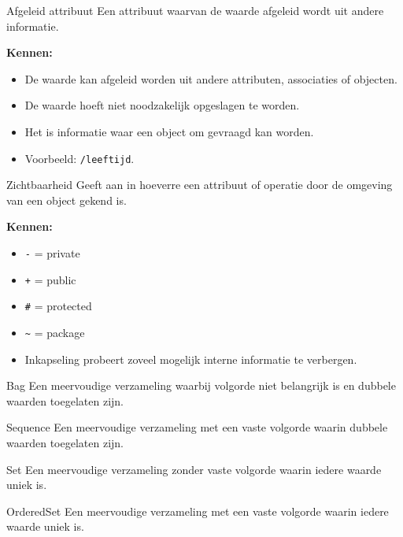 \documentclass[11pt,a4paper]{article}
\begin{document}
\begin{definition}{Afgeleid attribuut}
Een attribuut waarvan de waarde afgeleid wordt uit andere informatie.

\textbf{Kennen:}
\begin{itemize}
    \item De waarde kan afgeleid worden uit andere attributen, associaties of objecten.
    \item De waarde hoeft niet noodzakelijk opgeslagen te worden.
    \item Het is informatie waar een object om gevraagd kan worden.
    \item Voorbeeld: \texttt{/leeftijd}.
\end{itemize}
\end{definition}

\begin{definition}{Zichtbaarheid}
Geeft aan in hoeverre een attribuut of operatie door de omgeving van een object gekend is.

\textbf{Kennen:}
\begin{itemize}
    \item \texttt{-} = private
    \item \texttt{+} = public
    \item \texttt{\#} = protected
    \item \texttt{\textasciitilde} = package
    \item Inkapseling probeert zoveel mogelijk interne informatie te verbergen.
\end{itemize}
\end{definition}

\begin{definition}{Bag}
Een meervoudige verzameling waarbij volgorde niet belangrijk is en dubbele waarden toegelaten zijn.
\end{definition}

\begin{definition}{Sequence}
Een meervoudige verzameling met een vaste volgorde waarin dubbele waarden toegelaten zijn.
\end{definition}

\begin{definition}{Set}
Een meervoudige verzameling zonder vaste volgorde waarin iedere waarde uniek is.
\end{definition}

\begin{definition}{OrderedSet}
Een meervoudige verzameling met een vaste volgorde waarin iedere waarde uniek is.
\end{definition}
\end{document}
